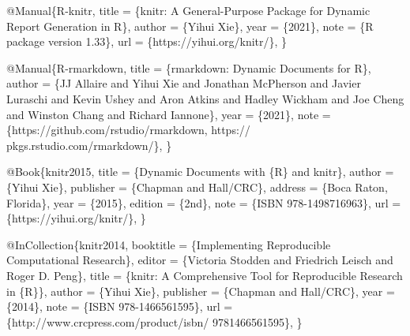 \documentclass[
  11pt,
  lualatex,ja=standard,jafont=noto]{bxjsreport}
\newenvironment{Shaded}{\begin{snugshade}}{\end{snugshade}}
\newcommand{\DataTypeTok}[1]{\textcolor[rgb]{0.13,0.29,0.53}{#1}}
\newcommand{\NormalTok}[1]{#1}
\newcommand{\OtherTok}[1]{\textcolor[rgb]{0.56,0.35,0.01}{#1}}
\newcommand{\VariableTok}[1]{\textcolor[rgb]{0.00,0.00,0.00}{#1}}
\begin{document}
\begin{Shaded}
\begin{Highlighting}[]
\VariableTok{@Manual}\NormalTok{\{}\OtherTok{R}\NormalTok{{-}}\OtherTok{knitr}\NormalTok{,}
  \DataTypeTok{title}\NormalTok{ = \{knitr: A General{-}Purpose Package for Dynamic}
\NormalTok{    Report Generation in R\},}
  \DataTypeTok{author}\NormalTok{ = \{Yihui Xie\},}
  \DataTypeTok{year}\NormalTok{ = \{2021\},}
  \DataTypeTok{note}\NormalTok{ = \{R package version 1.33\},}
  \DataTypeTok{url}\NormalTok{ = \{https://yihui.org/knitr/\},}
\NormalTok{\}}

\VariableTok{@Manual}\NormalTok{\{}\OtherTok{R}\NormalTok{{-}}\OtherTok{rmarkdown}\NormalTok{,}
  \DataTypeTok{title}\NormalTok{ = \{rmarkdown: Dynamic Documents for R\},}
  \DataTypeTok{author}\NormalTok{ = \{JJ Allaire and Yihui Xie and Jonathan McPherson}
\NormalTok{    and Javier Luraschi and Kevin Ushey and Aron Atkins}
\NormalTok{    and Hadley Wickham and Joe Cheng and Winston Chang and}
\NormalTok{    Richard Iannone\},}
  \DataTypeTok{year}\NormalTok{ = \{2021\},}
  \DataTypeTok{note}\NormalTok{ = \{https://github.com/rstudio/rmarkdown, https://}
\NormalTok{    pkgs.rstudio.com/rmarkdown/\},}
\NormalTok{\}}

\VariableTok{@Book}\NormalTok{\{}\OtherTok{knitr2015}\NormalTok{,}
  \DataTypeTok{title}\NormalTok{ = \{Dynamic Documents with \{R\} and knitr\},}
  \DataTypeTok{author}\NormalTok{ = \{Yihui Xie\},}
  \DataTypeTok{publisher}\NormalTok{ = \{Chapman and Hall/CRC\},}
  \DataTypeTok{address}\NormalTok{ = \{Boca Raton, Florida\},}
  \DataTypeTok{year}\NormalTok{ = \{2015\},}
  \DataTypeTok{edition}\NormalTok{ = \{2nd\},}
  \DataTypeTok{note}\NormalTok{ = \{ISBN 978{-}1498716963\},}
  \DataTypeTok{url}\NormalTok{ = \{https://yihui.org/knitr/\},}
\NormalTok{\}}

\VariableTok{@InCollection}\NormalTok{\{}\OtherTok{knitr2014}\NormalTok{,}
  \DataTypeTok{booktitle}\NormalTok{ = \{Implementing Reproducible Computational}
\NormalTok{    Research\},}
  \DataTypeTok{editor}\NormalTok{ = \{Victoria Stodden and Friedrich Leisch and Roger}
\NormalTok{    D. Peng\},}
  \DataTypeTok{title}\NormalTok{ = \{knitr: A Comprehensive Tool for Reproducible}
\NormalTok{    Research in \{R\}\},}
  \DataTypeTok{author}\NormalTok{ = \{Yihui Xie\},}
  \DataTypeTok{publisher}\NormalTok{ = \{Chapman and Hall/CRC\},}
  \DataTypeTok{year}\NormalTok{ = \{2014\},}
  \DataTypeTok{note}\NormalTok{ = \{ISBN 978{-}1466561595\},}
  \DataTypeTok{url}\NormalTok{ = \{http://www.crcpress.com/product/isbn/}
\NormalTok{    9781466561595\},}
\NormalTok{\}}


\end{Highlighting}
\end{Shaded}
\end{document}
